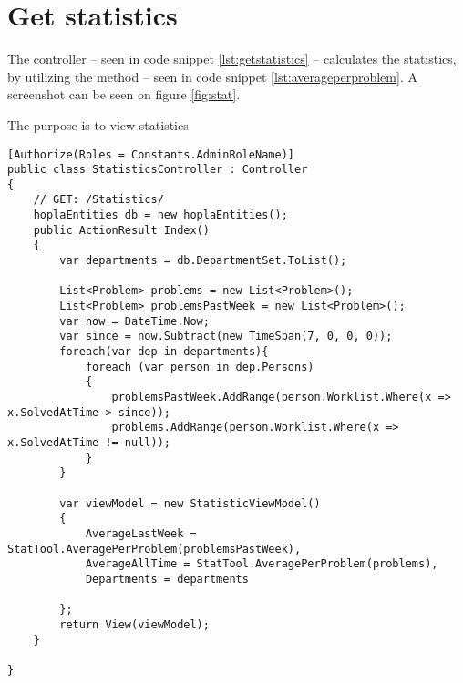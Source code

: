 \section{Get statistics}
\label{sec:getstatistics}

The  controller -- seen in code snippet \ref{lst:getstatistics} -- calculates the statistics, by utilizing the  method -- seen in code snippet \ref{lst:averageperproblem}. A screenshot can be seen on figure \ref{fig:stat}.

The purpose is to view statistics 

\begin{lstlisting}[style=sourceCode, caption=\myCaption{The StatisticsController controller}, label=lst:getstatistics]
[Authorize(Roles = Constants.AdminRoleName)]
public class StatisticsController : Controller
{
    // GET: /Statistics/
    hoplaEntities db = new hoplaEntities();
    public ActionResult Index()
    {
        var departments = db.DepartmentSet.ToList();
        
        List<Problem> problems = new List<Problem>();
        List<Problem> problemsPastWeek = new List<Problem>();
        var now = DateTime.Now;
        var since = now.Subtract(new TimeSpan(7, 0, 0, 0));
        foreach(var dep in departments){
            foreach (var person in dep.Persons)
            {
                problemsPastWeek.AddRange(person.Worklist.Where(x => x.SolvedAtTime > since));
                problems.AddRange(person.Worklist.Where(x => x.SolvedAtTime != null));
            }
        }

        var viewModel = new StatisticViewModel()
        {
            AverageLastWeek = StatTool.AveragePerProblem(problemsPastWeek),
            AverageAllTime = StatTool.AveragePerProblem(problems),
            Departments = departments
            
        };
        return View(viewModel);
    }

}
\end{lstlisting}


